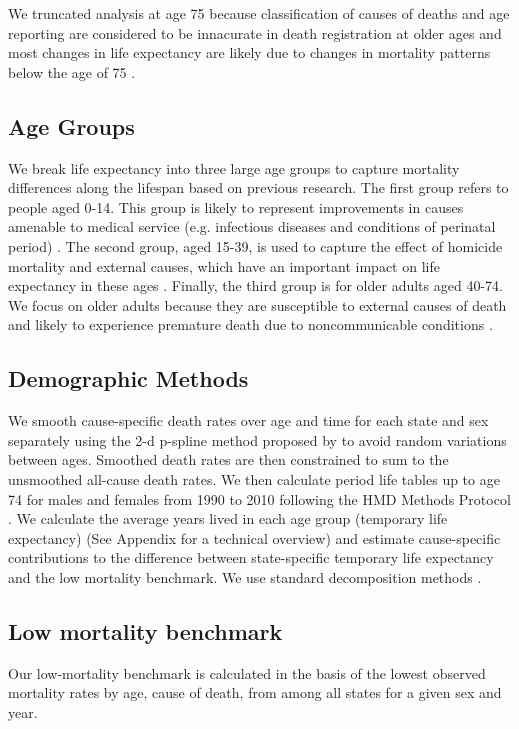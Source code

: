 \documentclass[11.5pt]{article}
\begin{document}
\begin{spacing}{1.5}
We truncated analysis at age 75 because classification of causes of deaths and age reporting are considered to be innacurate in death registration at older ages \citep{tobias2001} and most changes in life expectancy are likely due to changes in mortality patterns below the age of 75 \citep{Aburto2015}. 

\subsection*{Age Groups}

We break life expectancy into three large age groups to capture mortality differences along the lifespan based on previous research. The first group refers to people aged 0-14. This group is likely to represent improvements in causes amenable to medical service (e.g. infectious diseases and conditions of perinatal period) \citep{canudas2014}. The second group, aged 15-39, is used to capture the effect of homicide mortality and external causes, which have an important impact on life expectancy in these ages \citep{Aburto2015}. Finally, the third group is for older adults aged 40-74. 
We focus on older adults because they are susceptible to external causes of death and likely to experience premature death due to noncommunicable conditions \citep{canudas2014}.

\subsection*{Demographic Methods}
We smooth cause-specific death rates over age and time for each
state and sex separately using the 2-d p-spline method proposed by
\citet{GC2012} to avoid random variations between ages. Smoothed death rates are
then constrained to sum to the unsmoothed all-cause death rates. We then calculate period life tables up to
age 74 for males and females from 1990 to 2010 following the HMD Methods
Protocol \citep{HMDMP}. We calculate the average years lived in each age group (temporary life expectancy) \citep{arriaga1984} (See Appendix for a technical overview) and estimate cause-specific contributions to the difference between
state-specific temporary life expectancy and  the low mortality benchmark. We use
 standard decomposition methods \citep{horiuchi2008}.

\subsection*{Low mortality benchmark}
Our low-mortality benchmark is calculated in the basis of the lowest observed mortality rates by age, cause of death, from among all states for a given sex and year.



\end{spacing}
\end{document}

